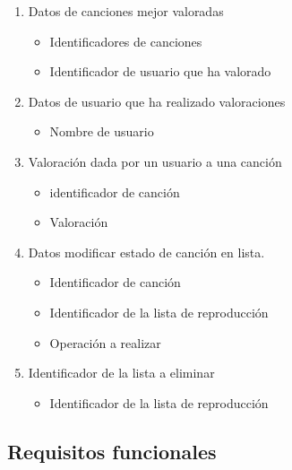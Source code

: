 \documentclass[12pt,a4paper]{article}
\begin{document}
\begin{enumerate}[label=\textnormal{RD\arabic*.}]
\begin{itemize}
		\end{itemize}
	\item Datos de canciones mejor valoradas  \label{rd32}
		\begin{itemize}
			\item Identificadores de canciones
			\item Identificador de usuario que ha valorado
		\end{itemize}
	\item Datos de usuario que ha realizado valoraciones  \label{rd33}
		\begin{itemize}
			\item Nombre de usuario
		\end{itemize}
		
	\item Valoración dada por un usuario a una canción  \label{rd34}
		\begin{itemize}
			\item identificador de canción
			\item Valoración
		\end{itemize}
		
	\item Datos modificar estado de canción en lista.  \label{rd35}
		\begin{itemize}
			\item Identificador de canción
			\item Identificador de la lista de reproducción
			\item Operación a realizar
		\end{itemize}
		
	\item Identificador de la lista a eliminar  \label{rd36}
		\begin{itemize}
			\item Identificador de la lista de reproducción
		\end{itemize}


\end{enumerate}


\subsection{Requisitos funcionales}
\end{document}
